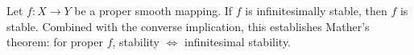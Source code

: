 Let $f: X \to Y$ be a proper smooth mapping. If $f$ is infinitesimally stable, then $f$ is stable. Combined with the converse implication, this establishes Mather's theorem: for proper $f$, stability $\Leftrightarrow$ infinitesimal stability.
